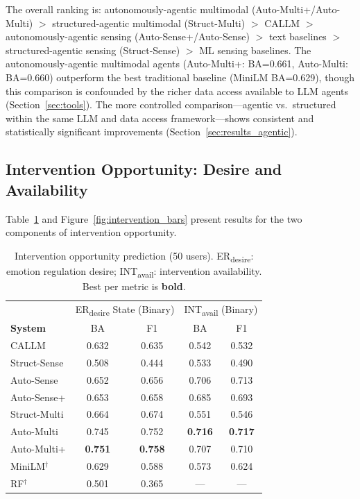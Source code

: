 \documentclass[screen,review,anonymous]{acmart}
\newcommand{\erdesire}{ER\textsubscript{desire}}
\newcommand{\intavail}{INT\textsubscript{avail}}
\begin{document}


The overall ranking is: autonomously-agentic multimodal (Auto-Multi+/Auto-Multi) $>$ structured-agentic multimodal (Struct-Multi) $>$ CALLM $>$ autonomously-agentic sensing (Auto-Sense+/Auto-Sense) $>$ text baselines $>$ structured-agentic sensing (Struct-Sense) $>$ ML sensing baselines. The autonomously-agentic multimodal agents (Auto-Multi+: BA=0.661, Auto-Multi: BA=0.660) outperform the best traditional baseline (MiniLM BA=0.629), though this comparison is confounded by the richer data access available to LLM agents (Section~\ref{sec:tools}). The more controlled comparison---agentic vs.\ structured within the same LLM and data access framework---shows consistent and statistically significant improvements (Section~\ref{sec:results_agentic}).

\subsection{Intervention Opportunity: Desire and Availability}
\label{sec:results_intervention}

Table~\ref{tab:intervention} and Figure~\ref{fig:intervention_bars} present results for the two components of intervention opportunity.

\begin{table}[t]
\caption{Intervention opportunity prediction (50 users). \erdesire{}: emotion regulation desire; \intavail{}: intervention availability. Best per metric is \textbf{bold}.}
\label{tab:intervention}
\small
\begin{tabular}{l cc cc}
\toprule
& \multicolumn{2}{c}{\erdesire{} State (Binary)} & \multicolumn{2}{c}{\intavail{} (Binary)} \\
\textbf{System} & BA & F1 & BA & F1 \\
\midrule
CALLM & 0.632 & 0.635 & 0.542 & 0.532 \\
Struct-Sense & 0.508 & 0.444 & 0.533 & 0.490 \\
Auto-Sense & 0.652 & 0.656 & 0.706 & 0.713 \\
Auto-Sense+ & 0.653 & 0.658 & 0.685 & 0.693 \\
Struct-Multi & 0.664 & 0.674 & 0.551 & 0.546 \\
Auto-Multi & 0.745 & 0.752 & \textbf{0.716} & \textbf{0.717} \\
Auto-Multi+ & \textbf{0.751} & \textbf{0.758} & 0.707 & 0.710 \\
\midrule
MiniLM$^\dagger$ & 0.629 & 0.588 & 0.573 & 0.624 \\
RF$^\dagger$ & 0.501 & 0.365 & --- & --- \\
\bottomrule
\end{tabular}
\end{table}
\end{document}
